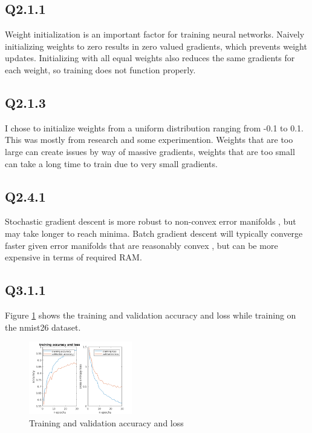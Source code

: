 \documentclass[12pt]{article}
\begin{document}
\subsection{Q2.1.1}
Weight initialization is an important factor for training neural networks. Naively initializing weights to zero results in zero valued gradients, which prevents weight updates. Initializing with all equal weights also reduces the same gradients for each weight, so training does not function properly. 

\subsection{Q2.1.3}
I chose to initialize weights from a uniform distribution ranging from -0.1 to 0.1. This was mostly from research and some experimention. Weights that are too large can create issues by way of massive gradients, weights that are too small can take a long time to train due to very small gradients.


\subsection{Q2.4.1}
Stochastic gradient descent is more robust to non-convex error manifolds , but may take longer to reach minima. Batch gradient descent will typically converge faster given error manifolds that are reasonably convex , but can be more expensive in terms of required RAM.

\subsection{Q3.1.1}
Figure \ref{fig:accloss} shows the training and validation accuracy and loss while training on the nmist26 dataset.
\begin{figure}[H]
\centering
\includegraphics[page=1,width=0.4\textwidth]{q311}
\caption{Training and validation accuracy and loss} 
\label{fig:accloss}
\end{figure}   
\end{document}
